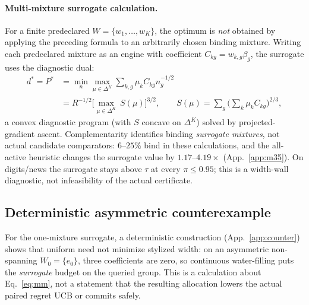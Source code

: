 \documentclass{article}
\begin{document}
\paragraph{Multi-mixture surrogate calculation.} For a finite predeclared
$W=\{w_1,\ldots,w_K\}$, the optimum is \emph{not} obtained by applying the preceding formula
to an arbitrarily chosen binding mixture. Writing each predeclared mixture as an engine with
coefficient $C_{kg}=w_{k,g}\beta_g$, the surrogate uses the diagnostic dual:
\begin{equation}
  \begin{aligned}
  d^*=P^*&=\min_n\max_{\mu\in\Delta^K}\sum_{k,g}\mu_k C_{kg}n_g^{-1/2}\\
         &=R^{-1/2}\big[\max_{\mu\in\Delta^K}\ S(\mu)\big]^{3/2},\qquad
  S(\mu)=\sum_g\big(\textstyle\sum_k \mu_k C_{kg}\big)^{2/3},
  \end{aligned}
  \label{eq:duality}
\end{equation}
a convex diagnostic program (with $S$ concave on $\Delta^K$) solved by projected-gradient
ascent. Complementarity identifies binding \emph{surrogate mixtures}, not actual candidate
comparators: $6$--$25\%$ bind in these calculations, and the all-active heuristic changes the
surrogate value by $1.17$--$4.19\times$ (App.~\ref{app:m35}). On digits/news the surrogate
stays above $\tau$ at every $\pi\le0.95$; this is a width-wall diagnostic, not infeasibility of
the actual certificate.

\subsection{Deterministic asymmetric counterexample}
For the one-mixture surrogate, a deterministic construction (App.~\ref{app:counter}) shows
that uniform need not minimize stylized width: on an asymmetric non-spanning $W_0=\{e_0\}$,
three coefficients are zero, so continuous water-filling puts the \emph{surrogate} budget on
the queried group. This is a
calculation about Eq.~\eqref{eq:mm}, not a statement that the resulting allocation lowers the
actual paired regret UCB or commits safely.
\end{document}
